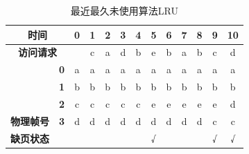 \begin{table}[H]
    \centering
    \begin{tabular}{|clc|c|c|c|c|c|c|c|c|c|c|c|}
        \hline
        \multicolumn{3}{|c|}{\textbf{时间}}                       & \textbf{0} & \textbf{1}               & \textbf{2}               & \textbf{3}               & \textbf{4}               & \textbf{5}               & \textbf{6}               & \textbf{7}               & \textbf{8}               & \textbf{9}               & \textbf{10}                                         \\ \hline
        \multicolumn{3}{|c|}{\textbf{访问请求}}                   &            & c                        & a                        & d                        & b                        & e                        & b                        & a                        & b                        & c                        & d                                                   \\ \hline
        \multicolumn{2}{|c|}{}                                    & \textbf{0} & {\color[HTML]{333333} a} & {\color[HTML]{333333} a} & {\color[HTML]{FE0000} a} & {\color[HTML]{333333} a} & {\color[HTML]{333333} a} & {\color[HTML]{333333} a} & {\color[HTML]{333333} a} & {\color[HTML]{FE0000} a} & {\color[HTML]{333333} a} & {\color[HTML]{333333} a} & {\color[HTML]{333333} a} \\ \cline{3-14}
        \multicolumn{2}{|c|}{}                                    & \textbf{1} & {\color[HTML]{333333} b} & {\color[HTML]{333333} b} & {\color[HTML]{333333} b} & {\color[HTML]{333333} b} & {\color[HTML]{FE0000} b} & {\color[HTML]{333333} b} & {\color[HTML]{FE0000} b} & {\color[HTML]{333333} b} & {\color[HTML]{FE0000} b} & {\color[HTML]{333333} b} & {\color[HTML]{333333} b} \\ \cline{3-14}
        \multicolumn{2}{|c|}{}                                    & \textbf{2} & {\color[HTML]{333333} c} & {\color[HTML]{FE0000} c} & {\color[HTML]{333333} c} & {\color[HTML]{333333} c} & {\color[HTML]{333333} c} & {\color[HTML]{FE0000} e} & {\color[HTML]{333333} e} & {\color[HTML]{333333} e} & {\color[HTML]{333333} e} & {\color[HTML]{333333} e} & {\color[HTML]{FE0000} d} \\ \cline{3-14}
        \multicolumn{2}{|c|}{\multirow{-4}{*}{\textbf{物理帧号}}} & \textbf{3} & {\color[HTML]{333333} d} & {\color[HTML]{333333} d} & {\color[HTML]{333333} d} & {\color[HTML]{FE0000} d} & {\color[HTML]{333333} d} & {\color[HTML]{333333} d} & {\color[HTML]{333333} d} & {\color[HTML]{333333} d} & {\color[HTML]{333333} d} & {\color[HTML]{FE0000} c} & {\color[HTML]{333333} c} \\ \hline
        \multicolumn{2}{|c|}{\textbf{缺页状态}}                   &            &                          &                          &                          &                          &                          & √                        &                          &                          &                          & √                        & √                        \\ \hline
    \end{tabular}
    \caption{最近最久未使用算法LRU}
\end{table}

